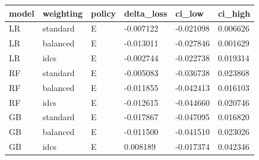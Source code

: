\begin{tabular}{llllll}
\hline
model & weighting & policy & delta\_loss & ci\_low & ci\_high \\
\hline
LR & standard & E & -0.007122 & -0.021098 & 0.006626 \\
LR & balanced & E & -0.013011 & -0.027846 & 0.001629 \\
LR & idcs & E & -0.002744 & -0.022738 & 0.019314 \\
RF & standard & E & -0.005083 & -0.036738 & 0.023868 \\
RF & balanced & E & -0.011855 & -0.042413 & 0.016103 \\
RF & idcs & E & -0.012615 & -0.044660 & 0.020746 \\
GB & standard & E & -0.017867 & -0.047095 & 0.016820 \\
GB & balanced & E & -0.011500 & -0.041510 & 0.023026 \\
GB & idcs & E & 0.008189 & -0.017374 & 0.042346 \\
\hline
\end{tabular}
